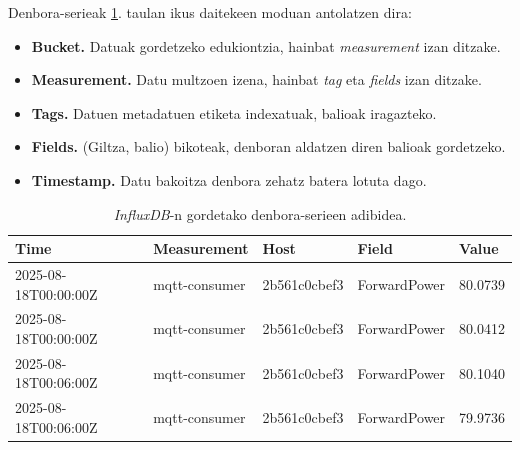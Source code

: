 \documentclass[12pt]{article}
\numberwithin{figure}{section}
\numberwithin{equation}{section}
\begin{document}
Denbora-serieak \ref{tab:influxdb}. taulan ikus daitekeen moduan antolatzen dira:

\begin{itemize}
    \item \textbf{Bucket.}  Datuak gordetzeko edukiontzia, hainbat \textit{measurement} izan ditzake.
    \item \textbf{Measurement.} Datu multzoen izena, hainbat \textit{tag} eta \textit{fields} izan ditzake.
    \item \textbf{Tags.} Datuen metadatuen etiketa indexatuak, balioak iragazteko.
    \item \textbf{Fields.} (Giltza, balio) bikoteak, denboran aldatzen diren balioak gordetzeko.
    \item \textbf{Timestamp.} Datu bakoitza denbora zehatz batera lotuta dago.
\end{itemize}

\begin{table}[h]
    \centering
    \begin{tabular}{lllll}
        \toprule
        \textbf{Time} & \textbf{Measurement} & \textbf{Host} & \textbf{Field} & \textbf{Value} \\
        \midrule
        2025-08-18T00:00:00Z & mqtt-consumer & 2b561c0cbef3 & ForwardPower & 80.0739 \\
        2025-08-18T00:00:00Z & mqtt-consumer & 2b561c0cbef3 & ForwardPower & 80.0412 \\
        2025-08-18T00:06:00Z & mqtt-consumer & 2b561c0cbef3 & ForwardPower & 80.1040 \\
        2025-08-18T00:06:00Z & mqtt-consumer & 2b561c0cbef3 & ForwardPower & 79.9736 \\
        \bottomrule
    \end{tabular}
    \caption{\textit{InfluxDB}-n gordetako denbora-serieen adibidea.}
    \label{tab:influxdb}
\end{table}
\end{document}
